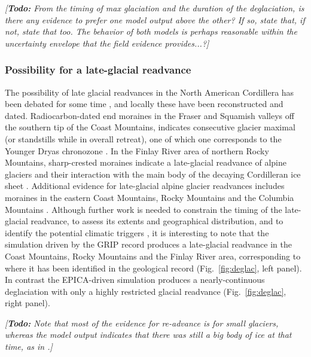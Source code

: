 \documentclass[tc, manuscript]{copernicus}
\newcommand{\todo}[1]{\emph{[\textbf{Todo:} #1]}}
\begin{document}
\todo{From the timing of max glaciation and the duration of the deglaciation,
is there any evidence to prefer one model output above the other? If so, state
that, if not, state that too. The behavior of both models is perhaps reasonable
within the uncertainty envelope that the field evidence provides...?}

\subsubsection{Possibility for a late-glacial readvance}

The possibility of late glacial readvances in the North American Cordillera has
been debated for some time \citep{Osborn.Gerloff.1997}, and locally these have
been reconstructed and dated. Radiocarbon-dated end moraines in the Fraser and
Squamish valleys off the southern tip of the Coast Mountains, indicates
consecutive glacier maximal (or standstills while in overall retreat), one of
which one corresponds to the Younger Dryas chronozone \citep{Clague.etal.1997,
Friele.Clague.2002, Friele.Clague.2002a, Kovanen.2002,
Kovanen.Easterbrook.2002}. In the Finlay River area of northern Rocky
Mountains, sharp-crested moraines indicate a late-glacial readvance of alpine
glaciers and their interaction with the main body of the decaying Cordilleran
ice sheet \citep{Lakeman.etal.2008}. Additional evidence for late-glacial
alpine glacier readvances includes moraines in the eastern Coast Mountains,
Rocky Mountains and the Columbia Mountains \citep{Osborn.Gerloff.1997,
Menounos.etal.2008}. Although further work is needed to constrain the timing of
the late-glacial readvance, to assess its extents and geographical
distribution, and to identify the potential climatic triggers
\citep{Menounos.etal.2008}, it is interesting to note that the simulation
driven by the GRIP record produces a late-glacial readvance in the Coast
Mountains, Rocky Mountains and the Finlay River area, corresponding to where it
has been identified in the geological record (Fig.~\ref{fig:deglac}, left
panel). In contrast the EPICA-driven simulation produces a nearly-continuous
deglaciation with only a highly restricted glacial readvance
(Fig.~\ref{fig:deglac}, right panel).

\todo{Note that most of the evidence for re-advance is for small glaciers,
      whereas the model output indicates that there was still a big body of ice
      at that time, as in \citet{Lakeman.etal.2008}.}
\end{document}
